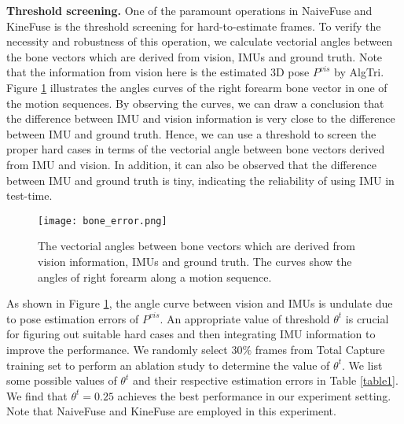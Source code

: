 \documentclass[lettersize,journal]{IEEEtran}
\begin{document}
\noindent \textbf{Threshold screening.}
\quad One of the paramount operations in NaiveFuse and KineFuse is the threshold screening for hard-to-estimate frames. To verify the necessity and robustness of this operation, we calculate vectorial angles between the bone vectors which are derived from vision, IMUs and ground truth. Note that the information from vision here is the estimated 3D pose $P^{vis}$ by AlgTri. Figure \ref{fig4} illustrates the angles curves of the right forearm bone vector in one of the motion sequences. By observing the curves, we can draw a conclusion that the difference between IMU and vision information is very close to the difference between IMU and ground truth. Hence, we can use a threshold to screen the proper hard cases in terms of the vectorial angle between bone vectors derived from IMU and vision. In addition, it can also be observed that the difference between IMU and ground truth is tiny, indicating the reliability of using IMU in test-time.

\begin{figure}[!tp]
 \begin{center}
 	\centerline{\texttt{[image: bone\_error.png]}}
\caption{The vectorial angles between bone vectors which are derived from vision information, IMUs and ground truth. The curves show the angles of right forearm along a motion sequence.}
\label{fig4}
\end{center}
\end{figure}

As shown in Figure \ref{fig4}, the angle curve between vision and IMUs is undulate due to pose estimation errors of $P^{vis}$. An appropriate value of threshold $\theta^{t}$ is crucial for figuring out suitable hard cases and then integrating IMU information to improve the performance. We randomly select $30 \%$ frames from Total Capture training set to perform an ablation study to determine the value of $\theta^{t}$. We list some possible values of $\theta^{t}$ and their respective estimation errors in Table \ref{table1}. We find that $\theta^{t} = 0.25$ achieves the best performance in our experiment setting. Note that NaiveFuse and KineFuse are employed in this experiment.

\begin{table}[!tp]
\caption{Different value of $\theta^{t}$ for methods that apply threshold screening and their respective 3D pose estimation errors (mm) in random selected validation set.}
\begin{center}
\end{center}
\label{table1}
\end{table}
\end{document}
